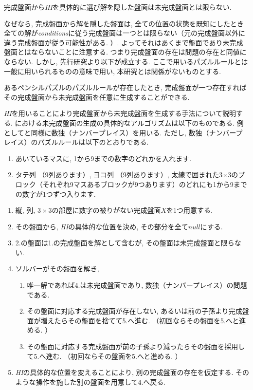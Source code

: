 \begin{remark}\label{remark:HI}
  完成盤面から\textit{HI}を具体的に選び解を隠した盤面は未完成盤面とは限らない.
\end{remark}
なぜなら, 完成盤面から解を隠した盤面は, 全ての位置の状態を既知にしたとき全ての解が\textit{conditions}に従う完成盤面は一つとは限らない（元の完成盤面以外に違う完成盤面が従う可能性がある. ）. よってそれはあくまで盤面であり未完成盤面とはならないことに注意する. つまり完成盤面の存在は問題の存在と同値にならない. しかし, 先行研究\cite{Fujiwara2022}より以下が成立する. ここで用いるパズルルールとは一般に用いられるものの意味で用い, 本研究とは関係がないものとする.
\begin{lemma}\label{lemma:CompleteBoard}
  あるペンシルパズルのパズルルールが存在したとき, 完成盤面が一つ存在すればその完成盤面から未完成盤面を任意に生成することができる.
\end{lemma}
\textit{HI}を用いることにより完成盤面から未完成盤面を生成する手法について説明する. \cite{Fujiwara2022}における未完成盤面の生成の具体的なアルゴリズムは以下のものである. 例として\cite{Fujiwara2022}と同様に数独（ナンバープレイス）を用いる. ただし, 数独（ナンバープレイス）のパズルルールは以下のとおりである. \cite{web:Sudoku}

\begin{enumerate}
  \item あいているマスに,  1から9までの数字のどれかを入れます.
  \item タテ列 （9列あります）,  ヨコ列 （9列あります）,  太線で囲まれた3$\times$3のブロック（それぞれ9マスあるブロックが9つあります）のどれにも1から9までの数字が1つずつ入ります.
\end{enumerate}

\begin{example}[遺伝的アルゴリズム]\label{example:GenericAlgorithm}
  \begin{enumerate}
    \item 縦, 列, $3\times3$の部屋に数字の被りがない完成盤面$X$を1つ用意する.
    \item その盤面から, \textit{HI}の具体的な位置を決め, その部分を全て$null$にする.
    \item 2.の盤面は1.の完成盤面を解として含むが, その盤面は未完成盤面と限らない.
    \item ソルバーがその盤面を解き,
          \begin{enumerate}
            \item 唯一解であれば4.は未完成盤面であり, 数独（ナンバープレイス）の問題である.
            \item その盤面に対応する完成盤面が存在しない, あるいは前の子孫より完成盤面が増えたらその盤面を捨てて5.へ進む. （初回ならその盤面を5.へと進める. ）
            \item その盤面に対応する完成盤面が前の子孫より減ったらその盤面を採用して5.へ進む. （初回ならその盤面を5.へと進める. ）
          \end{enumerate}
    \item \textit{HI}の具体的な位置を変えることにより, 別の完成盤面の存在を仮定する. そのような操作を施した別の盤面を用意して4.へ戻る.
  \end{enumerate}
\end{example}

